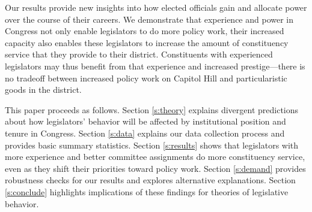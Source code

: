 \documentclass[12pt]{article}
\begin{document}
 


Our results provide new insights into how elected officials gain and allocate power over the course of their careers. We demonstrate that experience and power in Congress not only enable legislators to do more policy work, their increased capacity also enables these legislators to increase the amount of constituency service that they provide to their district. Constituents with experienced legislators may thus benefit from that experience and increased prestige---there is no tradeoff between increased policy work on Capitol Hill and particularistic goods in the district. 


This paper proceeds as follows. Section \ref{s:theory} explains divergent predictions about how legislators' behavior will be affected by institutional position and tenure in Congress. Section \ref{s:data} explains our data collection process and provides basic summary statistics. Section \ref{s:results} shows that legislators with more experience and better committee assignments do more constituency service, even as they shift their priorities toward policy work. Section \ref{s:demand} provides robustness checks for our results and explores alternative explanations. Section \ref{s:conclude} highlights implications of these findings for theories of legislative behavior.
\end{document}
